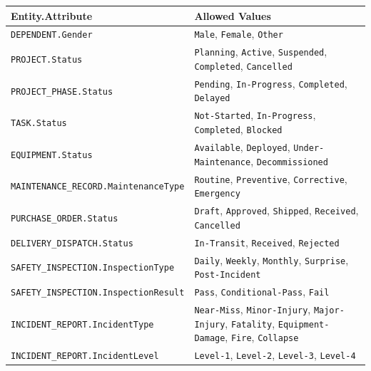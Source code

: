 \documentclass[a4paper,12pt]{report}
\newcounter{none} %
\begin{document}
{\def\LTcaptype{none} %
\begin{longtable}[]{@{}
  >{\raggedright\arraybackslash}p{}
  >{\raggedright\arraybackslash}p{}@{}}
\toprule\noalign{}
\begin{minipage}[b]{\linewidth}\raggedright
Entity.\allowbreak{}Attribute
\end{minipage} & \begin{minipage}[b]{\linewidth}\raggedright
Allowed Values
\end{minipage} \\
\midrule\noalign{}
\endhead
\bottomrule\noalign{}
\endlastfoot
\texttt{DEPENDENT.\allowbreak{}Gender} & \texttt{Male}, \texttt{Female}, \texttt{Other} \\
\texttt{PROJECT.\allowbreak{}Status} & \texttt{Planning}, \texttt{Active}, \texttt{Suspended}, \texttt{Completed}, \texttt{Cancelled} \\
\texttt{PROJECT\_\allowbreak{}PHASE.\allowbreak{}Status} & \texttt{Pending}, \texttt{In-Progress}, \texttt{Completed}, \texttt{Delayed} \\
\texttt{TASK.\allowbreak{}Status} & \texttt{Not-Started}, \texttt{In-Progress}, \texttt{Completed}, \texttt{Blocked} \\
\texttt{EQUIPMENT.\allowbreak{}Status} & \texttt{Available}, \texttt{Deployed}, \texttt{Under-Maintenance}, \texttt{Decommissioned} \\
\texttt{MAINTENANCE\_\allowbreak{}RECORD.\allowbreak{}MaintenanceType} & \texttt{Routine}, \texttt{Preventive}, \texttt{Corrective}, \texttt{Emergency} \\
\texttt{PURCHASE\_\allowbreak{}ORDER.\allowbreak{}Status} & \texttt{Draft}, \texttt{Approved}, \texttt{Shipped}, \texttt{Received}, \texttt{Cancelled} \\
\texttt{DELIVERY\_\allowbreak{}DISPATCH.\allowbreak{}Status} & \texttt{In-Transit}, \texttt{Received}, \texttt{Rejected} \\
\texttt{SAFETY\_\allowbreak{}INSPECTION.\allowbreak{}InspectionType} & \texttt{Daily}, \texttt{Weekly}, \texttt{Monthly}, \texttt{Surprise}, \texttt{Post-Incident} \\
\texttt{SAFETY\_\allowbreak{}INSPECTION.\allowbreak{}InspectionResult} & \texttt{Pass}, \texttt{Conditional-Pass}, \texttt{Fail} \\
\texttt{INCIDENT\_\allowbreak{}REPORT.\allowbreak{}IncidentType} & \texttt{Near-Miss}, \texttt{Minor-Injury}, \texttt{Major-Injury}, \texttt{Fatality}, \texttt{Equipment-Damage}, \texttt{Fire}, \texttt{Collapse} \\
\texttt{INCIDENT\_\allowbreak{}REPORT.\allowbreak{}IncidentLevel} & \texttt{Level-1}, \texttt{Level-2}, \texttt{Level-3}, \texttt{Level-4} \\
\end{longtable}
}
\end{document}
